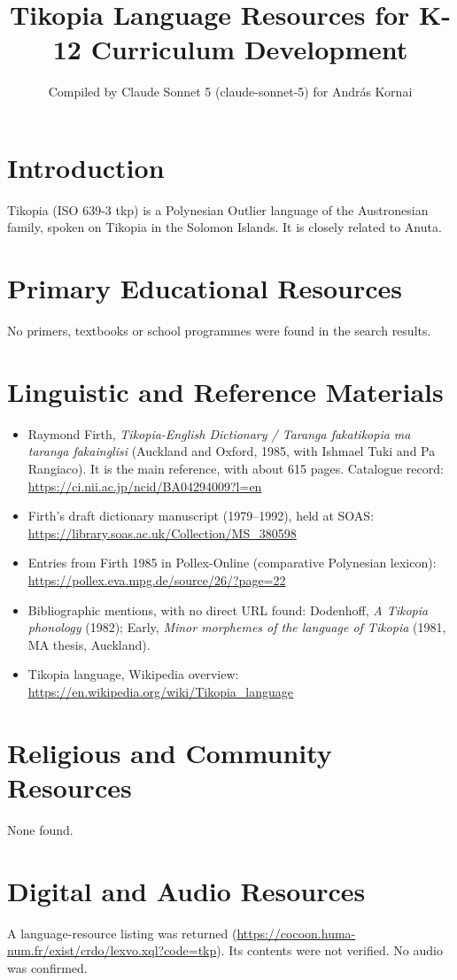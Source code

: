 \documentclass[12pt]{article}
\title{Tikopia Language Resources for K-12 Curriculum Development}
\author{Compiled by Claude Sonnet 5 (claude-sonnet-5) for Andr\'as Kornai}
\date{}
\begin{document}
\maketitle

\section{Introduction}
Tikopia (ISO 639-3 tkp) is a Polynesian Outlier language of the Austronesian family, spoken on Tikopia in the Solomon Islands. It is closely related to Anuta.

\section{Primary Educational Resources}
No primers, textbooks or school programmes were found in the search results.

\section{Linguistic and Reference Materials}
\begin{itemize}
\item Raymond Firth, \emph{Tikopia-English Dictionary / Taranga fakatikopia ma taranga fakainglisi} (Auckland and Oxford, 1985, with Ishmael Tuki and Pa Rangiaco). It is the main reference, with about 615 pages. Catalogue record: \url{https://ci.nii.ac.jp/ncid/BA04294009?l=en}
\item Firth's draft dictionary manuscript (1979--1992), held at SOAS: \url{https://library.soas.ac.uk/Collection/MS_380598}
\item Entries from Firth 1985 in Pollex-Online (comparative Polynesian lexicon): \url{https://pollex.eva.mpg.de/source/26/?page=22}
\item Bibliographic mentions, with no direct URL found: Dodenhoff, \emph{A Tikopia phonology} (1982); Early, \emph{Minor morphemes of the language of Tikopia} (1981, MA thesis, Auckland).
\item Tikopia language, Wikipedia overview: \url{https://en.wikipedia.org/wiki/Tikopia_language}
\end{itemize}

\section{Religious and Community Resources}
None found.

\section{Digital and Audio Resources}
A language-resource listing was returned (\url{https://cocoon.huma-num.fr/exist/crdo/lexvo.xql?code=tkp}). Its contents were not verified. No audio was confirmed.
\end{document}

